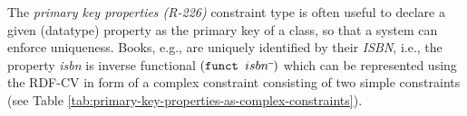 \documentclass[a4paper,fontsize=11pt]{scrartcl}
\newcommand{\ms}[1]{\texttt{#1}}
\begin{document}
%
%
%
The \emph{primary key properties (R-226)} constraint type is often useful to declare a given (datatype) property as the primary key of a class, so that a system can enforce uniqueness. 
Books, e.g., are uniquely identified by their \emph{ISBN}, i.e., the property \emph{isbn} is inverse functional \ms{$(\ms{funct } isbn\sp{\overline{\ }})$}
which can be represented using the RDF-CV in form of a complex constraint consisting of two simple constraints (see Table \ref{tab:primary-key-properties-as-complex-constraints}).

\end{document}
